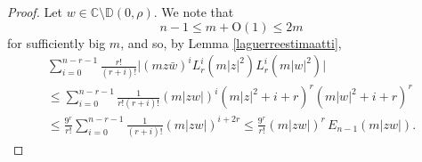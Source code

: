 \documentclass{birkart}
\theoremstyle{definition}
\theoremstyle{remark}
\numberwithin{equation}{section}
\numberwithin{figure}{section}
\newcommand{\1}{{\mathbf 1}}
\newcommand{\Rpar}{q}
\newcommand{\C}{{\mathbb C}}
\newcommand{\D}{{\mathbb D}}
\newcommand{\Ordo}{\mathrm{O}}
\begin{document}
\begin{proof}
Let $w\in\C\setminus\D(0,\rho)$. We note that 
\begin{equation}
n-1\le m+\Ordo(1)\le 2m
\label{eq-triv1}
\end{equation}
for sufficiently big $m$, and so, by Lemma \ref{laguerreestimaatti},
\begin{multline} 
\label{isonosanestimaatti}
\sum_{i=0}^{n-r-1} \frac{r!}{(r+i)!} 
\big|(mz\bar{w})^iL_r^{i}(m|z|^2)L_r^{i}(m|w|^2)\big| 
\\
\le\sum_{i=0}^{n-r-1} \frac{1}{r!(r+i)!} 
(m|zw|)^i(m|z|^2+i+r)^r(m|w|^2+i+r)^r 
\\
\leq \frac{9^{r}}{r!}\sum_{i=0}^{n-r-1} \frac{1}{(r+i)!}(m|zw|)^{i+2r}
\le\frac{9^{r}}{r!}(m|zw|)^{r}\,E_{n-1}(m|zw|). 
\end{multline}

\end{proof}
\end{document}
